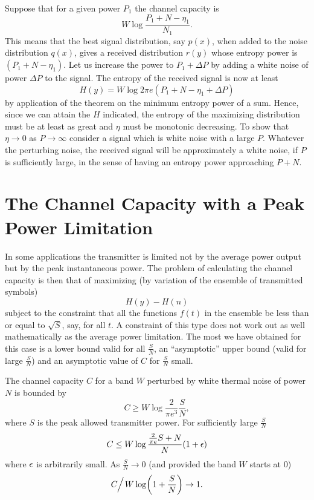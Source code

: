 Suppose that for a given power $P_1$ the channel capacity is
$$
W\log\frac{P_1+N-\eta_1}{N_1}.
$$
This means that the best signal distribution, say $p(x)$, when added to the
noise distribution $q(x)$, gives a received distribution $r(y)$ whose
entropy power is $(P_1+N-\eta_1)$.  Let us increase the power to
$P_1+\Delta P$ by adding a white noise of power $\Delta P$ to the signal.
The entropy of the received signal is now at least
$$
H(y)=W\log 2\pi e(P_1+N-\eta_1+\Delta P)
$$
by application of the theorem on the minimum entropy power of a sum.  Hence,
since we can attain the $H$ indicated, the entropy of the maximizing
distribution must be at least as great and $\eta$ must be monotonic
decreasing.  To show that $\eta\to0$ as $P\to\infty$ consider a signal which
is white noise with a large $P$.  Whatever the perturbing noise, the
received signal will be approximately a white noise, if $P$ is sufficiently
large, in the sense of having an entropy power approaching $P+N$.  

\section{The Channel Capacity with a Peak Power Limitation}

In some applications the transmitter is limited not by the average power
output but by the peak instantaneous power.  The problem of calculating the
channel capacity is then that of maximizing (by variation of the ensemble
of transmitted symbols)
$$
H(y)-H(n)
$$
subject to the constraint that all the functions $f(t)$ in the ensemble be
less than or equal to $\sqrt{S}$, say, for all $t$.  A constraint of this
type does not work out as well mathematically as the average power
limitation.  The most we have obtained for this case is a lower bound valid
for all $\displaystyle\frac S N$, an ``asymptotic'' upper bound (valid for
large $\displaystyle\frac S N$) and an asymptotic value of $C$ for
$\displaystyle\frac S N$ small.

\begin{theorem}
\label{thm:20}
The channel capacity $C$ for a band $W$ perturbed by white thermal noise of
power $N$ is bounded by
$$
C\geq W\log\frac{2}{\pi e^3}\frac S N,
$$
where $S$ is the peak allowed transmitter power.  For sufficiently large
$\displaystyle\frac S N$
$$
C\leq W\log\frac{\frac{2}{\pi e}S+N}{N}(1+\epsilon)
$$
where $\epsilon$ is arbitrarily small.  As $\displaystyle\frac S N\to0$ (and
provided the band $W$ starts at $0$)
$$
C \!\!\Bigm/\! W\log\biggl(1+\frac S N\biggr) \to 1.
$$
\end{theorem}

